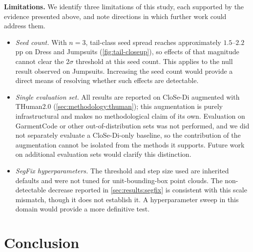 \documentclass{article}
\theoremstyle{plain}
\theoremstyle{definition}
\theoremstyle{remark}
\begin{document}
\textbf{Limitations.} We identify three limitations of this study, each supported by the evidence presented above, and note directions in which further work could address them.
\begin{itemize}
  \item \emph{Seed count.} With $n=3$, tail-class seed spread reaches approximately $1.5$--$2.2$pp on Dress and Jumpsuits (\cref{fig:tail-closeup}), so effects of that magnitude cannot clear the $2\sigma$ threshold at this seed count. This applies to the null result observed on Jumpsuits. Increasing the seed count would provide a direct means of resolving whether such effects are detectable.
  \item \emph{Single evaluation set.} All results are reported on CloSe-Di augmented with THuman2.0 (\cref{sec:methodology:thuman}); this augmentation is purely infrastructural and makes no methodological claim of its own. Evaluation on GarmentCode or other out-of-distribution sets was not performed, and we did not separately evaluate a CloSe-Di-only baseline, so the contribution of the augmentation cannot be isolated from the methods it supports. Future work on additional evaluation sets would clarify this distinction.
  \item \emph{SegFix hyperparameters.} The threshold and step size used are inherited defaults and were not tuned for unit-bounding-box point clouds. The non-detectable decrease reported in \cref{sec:results:segfix} is consistent with this scale mismatch, though it does not establish it. A hyperparameter sweep in this domain would provide a more definitive test.
\end{itemize}

\section{Conclusion}
\label{sec:conclusion}
\end{document}
